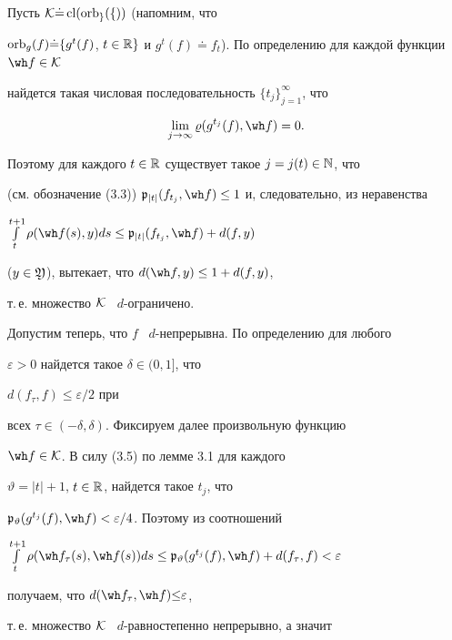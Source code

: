 \begin{pf}


Пусть $\cal K{\doteq}\operatorname{cl}(\operatorname{orb}_g(f))$ (напомним, что


$\orb_g(f){\doteq}\{g^{t}(f)$, $t\in\Bbb R\}$ и $g^t(f){\doteq}


f_t$). По определению для каждой функции $\wh f\in\cal K$


найдется такая числовая последовательность $\{t_j\}_{j=1}^\infty$, что


\begin{equation}


\lim_{j\to\infty}\varrho(g^{t_j}(f),\wh f)=0.


\end{equation}


Поэтому для каждого $t\in\Bbb R$ существует такое $j=j(t)\in\Bbb N$, что


(см. обозначение (3.3)) $\frak p_{|t|}(f_{t_j},\wh f)


\le 1$ и, следовательно, из неравенства


$\int\limits_t^{t+1}\rho(\wh f(s),y)ds\le


\frak p_{|t|}(f_{t_j},\wh f)+d(f,y)$


($y\in\frak Y$), вытекает, что $d(\wh f,y)\le 1+d(f,y)$,


т.\,е. множество $\cal K$ \ $d$-ограничено.





Допустим теперь, что $f$ \ $d$-непрерывна. По определению для любого


$\varepsilon>0$ найдется такое $\delta\in(0,1]$, что


$d(f_{\tau},f)\le\varepsilon/2$ при


всех $\tau\in(-\delta,\delta)$. Фиксируем далее произвольную функцию


$\wh f\in\cal K$. В силу (3.5) по лемме 3.1 для каждого


$\vartheta=|t|+1$, $t\in\Bbb R$, найдется такое $t_j$, что


$\frak p_\vartheta(g^{t_j}(f),\wh f)<\varepsilon/4$. Поэтому из соотношений


$\int\limits_t^{t+1}\rho(\wh f_{\tau}(s),\wh f(s))ds\le


\frak p_\vartheta(g^{t_j}(f),\wh f)+d(f_{\tau},f)<\varepsilon$


получаем, что $d(\wh f_{\tau},\wh f){\le}\varepsilon$,


т.\,е. множество $\cal K$ \ $d$-равностепенно непрерывно, а значит 



\end{pf}

